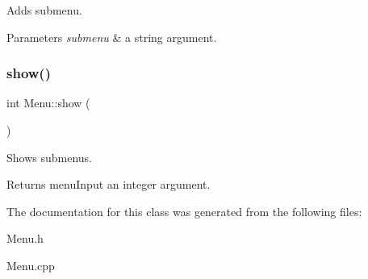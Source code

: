 Adds submenu. 


\begin{DoxyParams}{Parameters}
{\em submenu} & a string argument. \\
\hline
\end{DoxyParams}
\mbox{\label{classMenu_a346009151f57e18ffe0fa5a9dd89b1d6}} 
\subsubsection{\texorpdfstring{show()}{show()}}
{\footnotesize\ttfamily int Menu\+::show (\begin{DoxyParamCaption}{ }\end{DoxyParamCaption})}



Shows submenus. 

\begin{DoxyReturn}{Returns}
menu\+Input an integer argument. 
\end{DoxyReturn}


The documentation for this class was generated from the following files\+:\begin{DoxyCompactItemize}
\item 
Menu.\+h\item 
Menu.\+cpp\end{DoxyCompactItemize}
